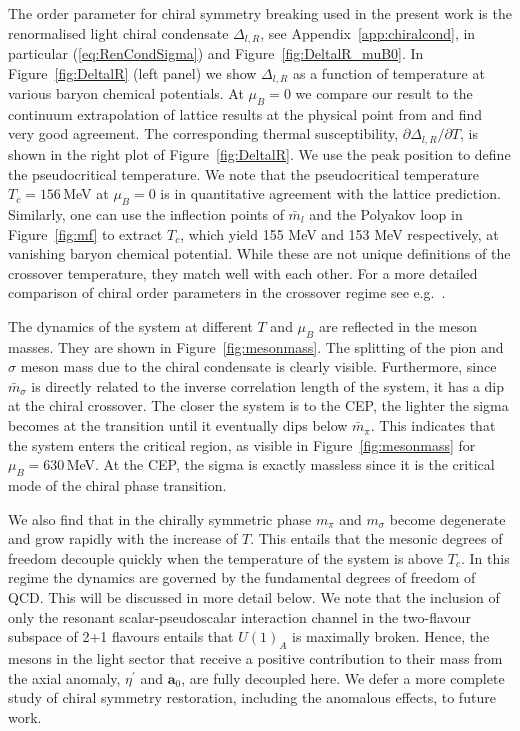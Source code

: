 \documentclass[%
reprint,
superscriptaddress,
showpacs,preprintnumbers,
 amsmath,amssymb,
 aps,
prd,
]{revtex4-1}
\def\Fig#1{Figure~\ref{#1}}
\def\eq#1{(\ref{#1})}
\def\app#1{Appendix~\ref{#1}}
\begin{document}
The order parameter for chiral symmetry breaking used in the present
work is the renormalised light chiral condensate $\Delta_{l,R}$, see
\app{app:chiralcond}, in particular \eq{eq:RenCondSigma} and
\Fig{fig:DeltalR_muB0}.  In \Fig{fig:DeltalR} (left panel) we show
$\Delta_{l,R}$ as a function of temperature at various baryon chemical
potentials. At $\mu_B=0$ we compare our result to the continuum
extrapolation of lattice results at the physical point from
\cite{Borsanyi:2010bp} and find very good agreement.  The
corresponding thermal susceptibility,
$\partial \Delta_{l,R}/\partial T$, is shown in the right plot of
\Fig{fig:DeltalR}. We use the peak position to define the
pseudocritical temperature.  We note that the pseudocritical
temperature $T_c=156$\,MeV at $\mu_B=0$ is in quantitative agreement
with the lattice prediction. Similarly, one can use the inflection
points of $\bar m_l$ and the Polyakov loop in \Fig{fig:mf} to extract
$T_c$, which yield 155 MeV and 153 MeV respectively, at vanishing
baryon chemical potential. While these are not unique definitions of
the crossover temperature, they match well with each other.  For a
more detailed comparison of chiral order parameters in the crossover
regime see e.g.\ \cite{Pawlowski:2014zaa}.


The dynamics of the system at different $T$ and $\mu_B$ are reflected
in the meson masses. They are shown in \Fig{fig:mesonmass}. The
splitting of the pion and $\sigma$ meson mass due to the chiral
condensate is clearly visible. Furthermore, since $\bar m_\sigma$ is
directly related to the inverse correlation length of the system, it
has a dip at the chiral crossover. The closer the system is to the
CEP, the lighter the sigma becomes at the transition until it
eventually dips below $\bar m_\pi$. This indicates that the system
enters the critical region, as visible in \Fig{fig:mesonmass} for
$\mu_B = 630$\,MeV. At the CEP, the sigma is exactly massless since it
is the critical mode of the chiral phase transition.

We also find that in the chirally symmetric phase $m_\pi$ and
$m_\sigma$ become degenerate and grow rapidly with the increase of
$T$. This entails that the mesonic degrees of freedom decouple quickly
when the temperature of the system is above $T_c$. In this regime the
dynamics are governed by the fundamental degrees of freedom of QCD.
This will be discussed in more detail below. We note that the
inclusion of only the resonant scalar-pseudoscalar interaction channel
in the two-flavour subspace of 2+1 flavours entails that $U(1)_A$ is
maximally broken. Hence, the mesons in the light sector that receive a
positive contribution to their mass from the axial anomaly,
$\eta^\prime$ and $\bm{a}_0$, are fully decoupled here. We defer a
more complete study of chiral symmetry restoration, including the
anomalous effects, to future work.
\end{document}
